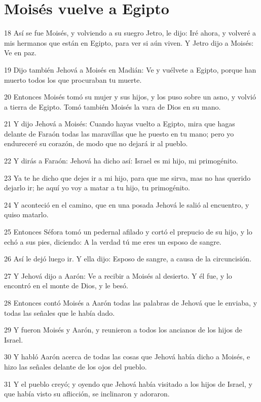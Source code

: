 \section*{Moisés vuelve a Egipto}

\par 18 Así se fue Moisés, y volviendo a su suegro Jetro, le dijo: Iré ahora, y volveré a mis hermanos que están en Egipto, para ver si aún viven. Y Jetro dijo a Moisés: Ve en paz.
\par 19 Dijo también Jehová a Moisés en Madián: Ve y vuélvete a Egipto, porque han muerto todos los que procuraban tu muerte.
\par 20 Entonces Moisés tomó su mujer y sus hijos, y los puso sobre un asno, y volvió a tierra de Egipto. Tomó también Moisés la vara de Dios en su mano.
\par 21 Y dijo Jehová a Moisés: Cuando hayas vuelto a Egipto, mira que hagas delante de Faraón todas las maravillas que he puesto en tu mano; pero yo endureceré su corazón, de modo que no dejará ir al pueblo.
\par 22 Y dirás a Faraón: Jehová ha dicho así: Israel es mi hijo, mi primogénito.
\par 23 Ya te he dicho que dejes ir a mi hijo, para que me sirva, mas no has querido dejarlo ir; he aquí yo voy a matar a tu hijo, tu primogénito.
\par 24 Y aconteció en el camino, que en una posada Jehová le salió al encuentro, y quiso matarlo.
\par 25 Entonces Séfora tomó un pedernal afilado y cortó el prepucio de su hijo, y lo echó a sus pies, diciendo: A la verdad tú me eres un esposo de sangre.
\par 26 Así le dejó luego ir. Y ella dijo: Esposo de sangre, a causa de la circuncisión.
\par 27 Y Jehová dijo a Aarón: Ve a recibir a Moisés al desierto. Y él fue, y lo encontró en el monte de Dios, y le besó.
\par 28 Entonces contó Moisés a Aarón todas las palabras de Jehová que le enviaba, y todas las señales que le había dado.
\par 29 Y fueron Moisés y Aarón, y reunieron a todos los ancianos de los hijos de Israel.
\par 30 Y habló Aarón acerca de todas las cosas que Jehová había dicho a Moisés, e hizo las señales delante de los ojos del pueblo.
\par 31 Y el pueblo creyó; y oyendo que Jehová había visitado a los hijos de Israel, y que había visto su aflicción, se inclinaron y adoraron.

